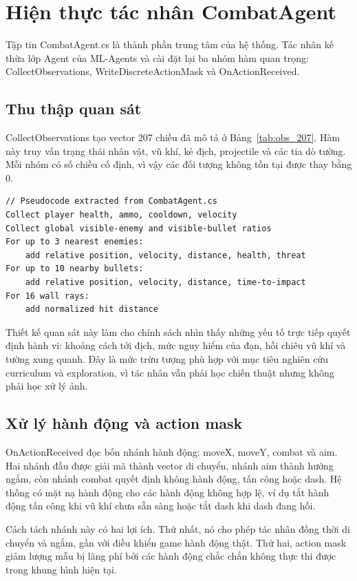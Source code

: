\section{Hiện thực tác nhân CombatAgent}

Tập tin CombatAgent.cs là thành phần trung tâm của hệ thống. Tác nhân kế thừa lớp Agent của ML-Agents và cài đặt lại ba nhóm hàm quan trọng: CollectObservations, WriteDiscreteActionMask và OnActionReceived.

\subsection{Thu thập quan sát}

CollectObservations tạo vector 207 chiều đã mô tả ở Bảng~\ref{tab:obs_207}. Hàm này truy vấn trạng thái nhân vật, vũ khí, kẻ địch, projectile và các tia dò tường. Mỗi nhóm có số chiều cố định, vì vậy các đối tượng không tồn tại được thay bằng 0.

\begin{lstlisting}
// Pseudocode extracted from CombatAgent.cs
Collect player health, ammo, cooldown, velocity
Collect global visible-enemy and visible-bullet ratios
For up to 3 nearest enemies:
    add relative position, velocity, distance, health, threat
For up to 10 nearby bullets:
    add relative position, velocity, distance, time-to-impact
For 16 wall rays:
    add normalized hit distance
\end{lstlisting}

Thiết kế quan sát này làm cho chính sách nhìn thấy những yếu tố trực tiếp quyết định hành vi: khoảng cách tới địch, mức nguy hiểm của đạn, hồi chiêu vũ khí và tường xung quanh. Đây là mức trừu tượng phù hợp với mục tiêu nghiên cứu curriculum và exploration, vì tác nhân vẫn phải học chiến thuật nhưng không phải học xử lý ảnh.

\subsection{Xử lý hành động và action mask}

OnActionReceived đọc bốn nhánh hành động: moveX, moveY, combat và aim. Hai nhánh đầu được giải mã thành vector di chuyển, nhánh aim thành hướng ngắm, còn nhánh combat quyết định không hành động, tấn công hoặc dash. Hệ thống có mặt nạ hành động cho các hành động không hợp lệ, ví dụ tắt hành động tấn công khi vũ khí chưa sẵn sàng hoặc tắt dash khi dash đang hồi.

Cách tách nhánh này có hai lợi ích. Thứ nhất, nó cho phép tác nhân đồng thời di chuyển và ngắm, gần với điều khiển game hành động thật. Thứ hai, action mask giảm lượng mẫu bị lãng phí bởi các hành động chắc chắn không thực thi được trong khung hình hiện tại.

